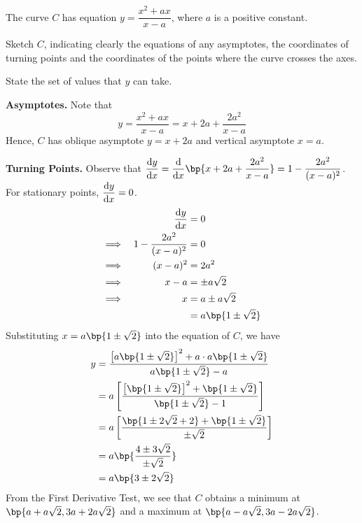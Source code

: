 \documentclass{echw}
\begin{document}

    \problem{}
        The curve $C$ has equation $y = \dfrac{x^2 + ax}{x - a}$, where $a$ is a positive constant.

        \medskip

         Sketch $C$, indicating clearly the equations of any asymptotes, the coordinates of turning points and the coordinates of the points where the curve crosses the axes.

        \medskip

         State the set of values that $y$ can take.

    \solution
        \textbf{Asymptotes.} Note that
        \[
            y = \dfrac{x^2 + ax}{x-a} = x + 2a + \dfrac{2a^2}{x-a}
        \]
        Hence, $C$ has oblique asymptote $y = x + 2a$ and vertical asymptote $x = a$.

        \medskip

         \textbf{Turning Points.} Observe that $\der{y}{x} = \der{}{x} \bp{x + 2a + \dfrac{2a^2}{x-a}} = 1 - \dfrac{2a^2}{(x-a)^2}$. For stationary points, $\dfrac{\mathrm{d} y}{\mathrm{d} x} = 0$.
        \begin{alignat*}{2}
            &&\der{y}{x} &= 0\\
            \implies&&1 - \dfrac{2a^2}{(x-a)^2} &= 0\\
            \implies&&(x-a)^2 &= 2a^2\\
            \implies&&x-a &= \pm a\sqrt2\\
            \implies&&x &= a \pm a\sqrt2\\
            && &= a\bp{1 \pm \sqrt2}
        \end{alignat*}
        Substituting $x = a\bp{1 \pm \sqrt2}$ into the equation of $C$, we have
        \begin{align*}
            y &= \dfrac{\left[a\bp{1 \pm \sqrt2}\right]^2 + a\cdot a\bp{1 \pm \sqrt2}}{a\bp{1 \pm \sqrt2} - a}\\
            &= a \left[\dfrac{\left[\bp{1 \pm \sqrt2}\right]^2 + \bp{1 \pm \sqrt2}}{\bp{1 \pm \sqrt2} - 1}\right]\\
            &= a \left[\dfrac{\bp{1 \pm 2\sqrt2 + 2} + \bp{1 \pm \sqrt2}}{\pm \sqrt2}\right]\\
            &= a \bp{\dfrac{4 \pm 3\sqrt2}{\pm \sqrt2}}\\
            &= a\bp{3 \pm 2\sqrt2}
        \end{align*}
        From the First Derivative Test, we see that $C$ obtains a minimum at $\bp{a + a\sqrt2, 3a + 2a\sqrt2}$ and a maximum at $\bp{a - a\sqrt2, 3a - 2a\sqrt2}$. 
\end{document}
